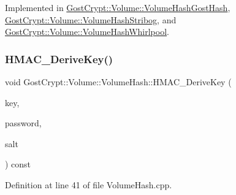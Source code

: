 Implemented in \hyperlink{class_gost_crypt_1_1_volume_1_1_volume_hash_gost_hash_aadbaf856de39d537036f536d24fcb8a1}{Gost\+Crypt\+::\+Volume\+::\+Volume\+Hash\+Gost\+Hash}, \hyperlink{class_gost_crypt_1_1_volume_1_1_volume_hash_stribog_a8a567d48e7edcb82128d931378468eff}{Gost\+Crypt\+::\+Volume\+::\+Volume\+Hash\+Stribog}, and \hyperlink{class_gost_crypt_1_1_volume_1_1_volume_hash_whirlpool_a5555824b76b08bf911216fbab8d242ef}{Gost\+Crypt\+::\+Volume\+::\+Volume\+Hash\+Whirlpool}.

\mbox{\label{class_gost_crypt_1_1_volume_1_1_volume_hash_a7a75b6a482e6876994834de0319bc0d5}} 
\subsubsection{\texorpdfstring{H\+M\+A\+C\+\_\+\+Derive\+Key()}{HMAC\_DeriveKey()}\hspace{0.1cm}{\footnotesize\ttfamily [1/2]}}
{\footnotesize\ttfamily void Gost\+Crypt\+::\+Volume\+::\+Volume\+Hash\+::\+H\+M\+A\+C\+\_\+\+Derive\+Key (\begin{DoxyParamCaption}\item[{const \hyperlink{class_gost_crypt_1_1_buffer_ptr}{Buffer\+Ptr} \&}]{key,  }\item[{const \hyperlink{class_gost_crypt_1_1_volume_1_1_volume_password}{Volume\+Password} \&}]{password,  }\item[{const \hyperlink{class_gost_crypt_1_1_buffer_ptr}{Buffer\+Ptr} \&}]{salt }\end{DoxyParamCaption}) const\hspace{0.3cm}{\ttfamily [virtual]}}



Definition at line 41 of file Volume\+Hash.\+cpp.

\mbox{\label{class_gost_crypt_1_1_volume_1_1_volume_hash_a6804d6896491ea8c0a7be6600b6d7113}} 
